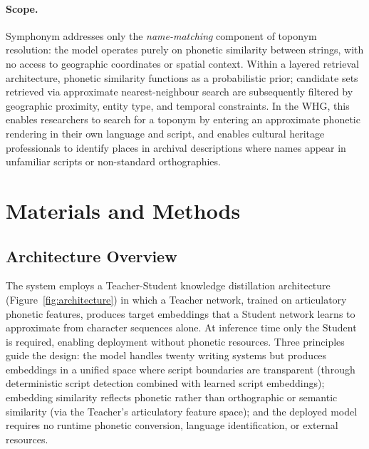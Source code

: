 \documentclass[11pt,a4paper]{article}
\begin{document}
\paragraph{Scope.} Symphonym addresses only the \emph{name-matching} component of toponym resolution: the model operates purely on phonetic similarity between strings, with no access to geographic coordinates or spatial context. Within a layered retrieval architecture, phonetic similarity functions as a probabilistic prior; candidate sets retrieved via approximate nearest-neighbour search are subsequently filtered by geographic proximity, entity type, and temporal constraints. In the WHG, this enables researchers to search for a toponym by entering an approximate phonetic rendering in their own language and script, and enables cultural heritage professionals to identify places in archival descriptions where names appear in unfamiliar scripts or non-standard orthographies.


\section{Materials and Methods}
\label{sec:methods}

\subsection{Architecture Overview}

The system employs a Teacher-Student knowledge distillation architecture~\citep{hinton2015distilling} (Figure~\ref{fig:architecture}) in which a Teacher network, trained on articulatory phonetic features, produces target embeddings that a Student network learns to approximate from character sequences alone. At inference time only the Student is required, enabling deployment without phonetic resources. Three principles guide the design: the model handles twenty writing systems but produces embeddings in a unified space where script boundaries are transparent (through deterministic script detection combined with learned script embeddings); embedding similarity reflects phonetic rather than orthographic or semantic similarity (via the Teacher's articulatory feature space); and the deployed model requires no runtime phonetic conversion, language identification, or external resources.
\end{document}
